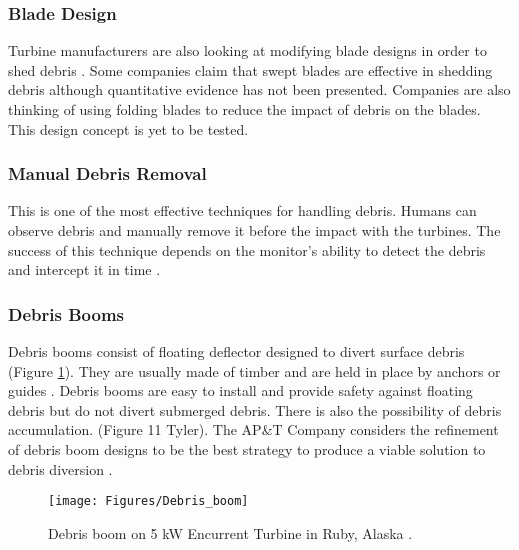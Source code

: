 \subsubsection{Blade Design}
Turbine manufacturers are also looking at modifying blade designs in order to shed debris \cite{Reference1}. Some companies claim that swept blades are effective in shedding debris although quantitative evidence has not been presented. Companies are also thinking of using folding blades to reduce the impact of debris on the blades. This design concept is yet to be tested.
\subsubsection{Manual Debris Removal}
This is one of the most effective techniques for handling debris. Humans can observe debris and manually remove it before the impact with the turbines. The success of this technique depends on the monitor's ability to detect the debris and intercept it in time \cite{Reference1}.
\subsubsection{Debris Booms}
Debris booms consist of floating deflector designed to divert surface debris (Figure \ref{fig:Debris_boom}). They are usually made of timber and are held in place by anchors or guides \cite{Reference5}. Debris booms are easy to install and provide safety against floating debris but do not divert submerged debris. There is also the possibility of debris accumulation. (Figure 11 Tyler). The AP\&T Company considers the refinement of debris boom designs to be the best strategy to produce a viable solution to debris  diversion \cite{Reference1}.  
\begin{figure}
\centering
\texttt{[image: Figures/Debris\_boom]}
\caption{\label{fig:Debris_boom}Debris boom on 5 kW Encurrent Turbine in Ruby, Alaska \cite{Reference1}.}
\end{figure}
